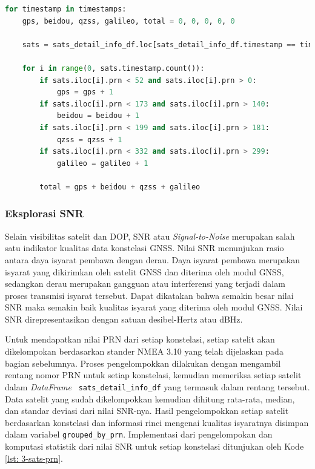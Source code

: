 \newpage
\vspace{0.3cm}
\begin{lstlisting}[language=python, style=mystyle, caption={Menghitung Jumlah Satelit untuk Setiap Konstelasi pada Python}, label={lst: 3-sats-count}]
for timestamp in timestamps:
	gps, beidou, qzss, galileo, total = 0, 0, 0, 0, 0
	
	sats = sats_detail_info_df.loc[sats_detail_info_df.timestamp == timestamp]
	
	for i in range(0, sats.timestamp.count()):
		if sats.iloc[i].prn < 52 and sats.iloc[i].prn > 0:
			gps = gps + 1
		if sats.iloc[i].prn < 173 and sats.iloc[i].prn > 140:
			beidou = beidou + 1
		if sats.iloc[i].prn < 199 and sats.iloc[i].prn > 181:
			qzss = qzss + 1
		if sats.iloc[i].prn < 332 and sats.iloc[i].prn > 299:
			galileo = galileo + 1 
		
		total = gps + beidou + qzss + galileo
\end{lstlisting}

\iffalse
\subsubsection{Eksplorasi SNR}
Selain visibilitas satelit dan DOP, SNR atau \textit{Signal-to-Noise} merupakan salah satu indikator kualitas data konstelasi GNSS. Nilai SNR menunjukan rasio antara daya isyarat pembawa dengan derau. Daya isyarat pembawa merupakan isyarat yang dikirimkan oleh satelit GNSS dan diterima oleh modul GNSS, sedangkan derau merupakan gangguan atau interferensi yang terjadi dalam proses transmisi isyarat tersebut. Dapat dikatakan bahwa semakin besar nilai SNR maka semakin baik kualitas isyarat yang diterima oleh modul GNSS. Nilai SNR direpresentasikan dengan satuan desibel-Hertz atau dBHz.

Untuk mendapatkan nilai PRN dari setiap konstelasi, setiap satelit akan dikelompokan berdasarkan stander NMEA 3.10 yang telah dijelaskan pada bagian sebelumnya. Proses pengelompokkan dilakukan dengan mengambil rentang nomor PRN untuk setiap konstelasi, kemudian memeriksa setiap satelit dalam \textit{DataFrame} \texttt{ sats\_detail\_info\_df} yang termasuk dalam rentang tersebut. Data satelit yang sudah dikelompokkan kemudian dihitung rata-rata, median, dan standar deviasi dari nilai SNR-nya. Hasil pengelompokkan setiap satelit berdasarkan konstelasi dan informasi rinci mengenai kualitas isyaratnya disimpan dalam variabel \texttt{grouped\_by\_prn}. Implementasi dari pengelompokan dan komputasi statistik dari nilai SNR untuk setiap konstelasi ditunjukan oleh Kode \ref{lst: 3-sats-prn}.

